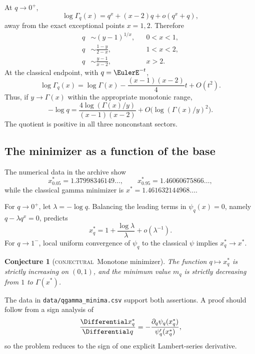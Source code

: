 \documentclass[11pt,oneside]{article}
\newtheorem{conjecture}[theorem]{Conjecture}
\theoremstyle{definition}
\theoremstyle{remark}
\theoremstyle{plain}
\theoremstyle{definition}
\theoremstyle{remark}
\newcommand{\statusconjectural}{\textcolor{conjectureorange}{\textsc{conjectural}}}
\numberwithin{equation}{section}
\numberwithin{figure}{section}
\numberwithin{table}{section}
\let\reportsubsection\subsection
\let\reportsubsubsection\subsubsection
\let\section\reportsubsection
\let\subsection\reportsubsubsection
\begin{document}
At \(q\to0^+\),
\begin{equation}
 \log\Gamma_q(x)=q^x+(x-2)q+o(q^x+q),
 \label{eq:qgamma-smallq}
\end{equation}
away from the exact exceptional points \(x=1,2\).  Therefore
\begin{align*}
 q&\sim(y-1)^{1/x},&&0<x<1,\\
 q&\sim\frac{1-y}{2-x},&&1<x<2,\\
 q&\sim\frac{y-1}{x-2},&&x>2.
\end{align*}
At the classical endpoint, with \(q=\EulerE^{-t}\),
\begin{equation}
 \log\Gamma_q(x)
 =\log\Gamma(x)-\frac{(x-1)(x-2)}4t+O(t^2).
 \label{eq:qgamma-q1-first}
\end{equation}
Thus, if \(y\to\Gamma(x)\) within the appropriate monotonic range,
\begin{equation}
 -\log q
 =\frac{4\log(\Gamma(x)/y)}{(x-1)(x-2)}
 +O\bigl(\log(\Gamma(x)/y)^2\bigr).
 \label{eq:qgamma-base-inverse-q1}
\end{equation}
The quotient is positive in all three nonconstant sectors.

\section{The minimizer as a function of the base}
The numerical data in the archive show
\[
 x_{0.05}^*=1.37998346149\ldots,
 \qquad
 x_{0.95}^*=1.46060675866\ldots,
\]
while the classical gamma minimizer is
\(x^*=1.461632144968\ldots\).

For \(q\to0^+\), let \(\lambda=-\log q\).  Balancing the leading terms in
\(\psi_q(x)=0\), namely \(q-\lambda q^x=0\), predicts
\begin{equation}
 x_q^*=1+\frac{\log\lambda}{\lambda}+o(\lambda^{-1}).
 \label{eq:qgamma-minimizer-smallq}
\end{equation}
For \(q\to1^-\), local uniform convergence of \(\psi_q\) to the classical
\(\psi\) implies \(x_q^*\to x^*\).

\begin{conjecture}[\statusconjectural\ Monotone minimizer]
The function \(q\mapsto x_q^*\) is strictly increasing on \((0,1)\), and the
minimum value \(m_q\) is strictly decreasing from \(1\) to
\(\Gamma(x^*)\).
\end{conjecture}
The data in \texttt{data/qgamma\_minima.csv} support both assertions.  A proof
should follow from a sign analysis of
\[
 \frac{\Differential x_q^*}{\Differential q}
 =-\frac{\partial_q\psi_q(x_q^*)}{\psi_q'(x_q^*)},
\]
so the problem reduces to the sign of one explicit Lambert-series derivative.
\end{document}
